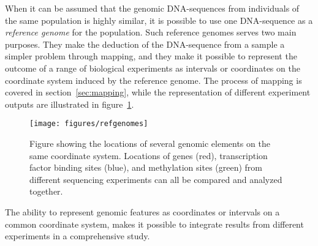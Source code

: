 When it can be assumed that the genomic DNA-sequences from individuals of the same population is highly similar, it is possible to use one DNA-sequence as a \emph{reference genome} for the population.
Such reference genomes serves two main purposes. They make the deduction of the DNA-sequence from a sample a simpler problem through mapping, and they make it possible to represent the outcome of a range of biological experiments as intervals or coordinates on the coordinate system induced by the reference genome. 
The process of mapping is covered in section~\ref{sec:mapping}, while the representation of different experiment outputs are illustrated in figure~\ref{fig:refpos}.

\begin{figure}
  \texttt{[image: figures/refgenomes]}
  \label{fig:refpos}
  \caption{Figure showing the locations of several genomic elements on the same coordinate system.
    Locations of genes (red), transcription factor binding sites (blue), and methylation sites (green) from different sequencing experiments can all be compared and analyzed together.}
\end{figure}

The ability to represent genomic features as coordinates or intervals on a common coordinate system, makes it possible to integrate results from different experiments in a comprehensive study.



